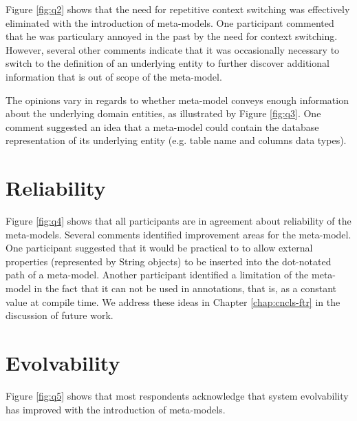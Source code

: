 \noindent Figure \ref{fig:q2} shows that the need for repetitive context switching was effectively eliminated with the introduction of meta-models.
One participant commented that he was particulary annoyed in the past by the need for context switching.
However, several other comments indicate that it was occasionally necessary to switch to the definition of an underlying entity to further discover additional information that is out of scope of the meta-model.

\noindent The opinions vary in regards to whether meta-model conveys enough information about the underlying domain entities, as illustrated by Figure \ref{fig:q3}.
One comment suggested an idea that a meta-model could contain the database representation of its underlying entity (e.g. table name and columns data types).

\section{Reliability}
\noindent Figure \ref{fig:q4} shows that all participants are in agreement about reliability of the meta-models.
Several comments identified improvement areas for the meta-model.
One participant suggested that it would be practical to to allow external properties (represented by String objects) to be inserted into the dot-notated path of a meta-model.
Another participant identified a limitation of the meta-model in the fact that it can not be used in annotations, that is, as a constant value at compile time.
We address these ideas in Chapter \ref{chap:cncls-ftr} in the discussion of future work.

\section{Evolvability}
\noindent Figure \ref{fig:q5} shows that most respondents acknowledge that system evolvability has improved with the introduction of meta-models.

